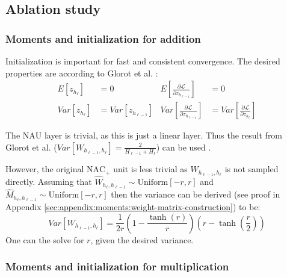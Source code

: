 \subsection{Ablation study}



\subsubsection{Moments and initialization for addition} \label{sssec:nac-add-moments}

Initialization is important for fast and consistent convergence. The desired properties are according to Glorot et al. \cite{glorot-initialization}:
\begin{equation}
\begin{aligned}
E[z_{h_\ell}] &= 0 & E\left[\frac{\partial \mathcal{L}}{\partial z_{h_{\ell-1}}}\right] &= 0 \\
Var[z_{h_\ell}] &= Var\left[z_{h_{\ell-1}}\right] &
Var\left[\frac{\partial \mathcal{L}}{\partial z_{h_{\ell-1}}}\right] &= Var\left[\frac{\partial \mathcal{L}}{\partial z_{h_{\ell}}}\right]
\end{aligned}
\end{equation}

The $\mathrm{NAU}$ layer is trivial, as this is just a linear layer. Thus the result from Glorot et al. ($Var[W_{h_{\ell-1},h_{\ell}}] = \frac{2}{H_{\ell-1} + H_{\ell}}$) can be used \cite{glorot-initialization}.

However, the original $\mathrm{NAC}_{+}$ unit is less trivial as $W_{h_{\ell-1},h_{\ell}}$ is not sampled directly. Assuming that $\hat{W}_{h_\ell, h_{\ell-1}} \sim \mathrm{Uniform}[-r, r]$ and $\hat{M}_{h_\ell, h_{\ell-1}} \sim \mathrm{Uniform}[-r, r]$ then the variance can be derived (see proof in Appendix \ref{sec:appendix:moments:weight-matrix-construction}) to be:
\begin{equation}
Var[W_{h_{\ell-1},h_{\ell}}] = \frac{1}{2r} \left(1 - \frac{\tanh(r)}{r}\right) \left(r - \tanh\left(\frac{r}{2}\right)\right)
\end{equation}
One can the solve for $r$, given the desired variance.

\subsubsection{Moments and initialization for multiplication} \label{sssec:nac-mul-moments}

